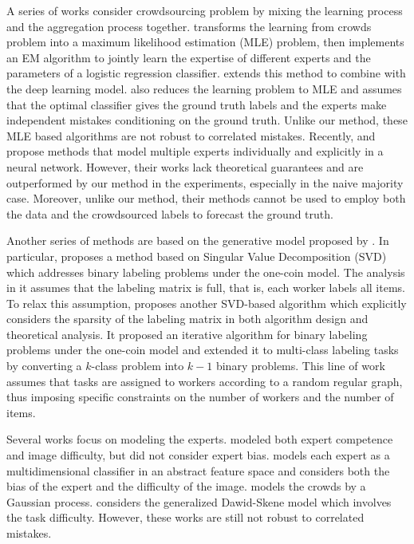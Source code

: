 \documentclass{article}
\begin{document}
A series of works consider crowdsourcing problem by mixing the learning process and the aggregation process together. \cite{karger2014budget} transforms the learning from crowds problem into a maximum likelihood estimation (MLE) problem, then implements an EM algorithm to jointly learn the expertise of different experts and the parameters of a logistic regression classifier. \cite{albarqouni2016aggnet} extends this method to combine with the deep learning model. \cite{khetan2017learning} also reduces the learning problem to MLE and assumes that the optimal classifier gives the ground truth labels and the experts make independent mistakes conditioning on the ground truth. Unlike our method, these MLE based algorithms are not robust to correlated mistakes. Recently, \cite{guan2018said} and \cite{rodrigues2018deep} propose methods that model multiple experts individually and explicitly in a neural network. However, their works lack theoretical guarantees and are outperformed by our method in the experiments, especially in the naive majority case. Moreover, unlike our method, their methods cannot be used to employ both the data and the crowdsourced labels to forecast the ground truth. 

Another series of methods are based on the generative model proposed by \cite{dawid1979maximum}. In particular, \cite{ghosh2011moderates} proposes a method based on Singular Value Decomposition (SVD) which addresses binary labeling problems under the one-coin model. The analysis in it assumes that the labeling matrix is full, that is, each worker labels all items. To relax this assumption, \cite{dalvi2013aggregating} proposes another SVD-based algorithm which explicitly considers the sparsity of the labeling matrix in both algorithm design and theoretical analysis. It proposed an iterative algorithm for binary labeling problems under the one-coin model and extended it to multi-class labeling tasks by converting a $k$-class problem into $k-1$ binary problems. This line of work assumes that tasks are assigned to workers according to a random regular graph, thus imposing specific constraints on the number of workers and the number of items. 

Several works focus on modeling the experts. \cite{whitehill2009whose} modeled both expert competence and image difficulty, but did not consider expert bias.
\cite{welinder2010multidimensional} models each expert as a multidimensional classifier in an abstract feature space and considers both the bias of the expert and the difficulty of the image. \cite{rodrigues2014gaussian} models the crowds by a Gaussian process. \cite{shah2016permutation} considers the generalized Dawid-Skene model \cite{dawid1979maximum} which involves the task difficulty. However, these works are still not robust to correlated mistakes.
\end{document}
